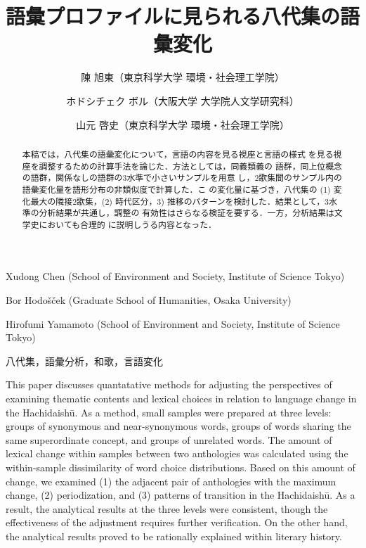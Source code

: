 \documentclass[submit]{ipsj}
\date{}
\title{}
\begin{document}
\title{語彙プロファイルに見られる八代集の語彙変化}


\author{陳 旭東（東京科学大学 環境・社会理工学院）}{Xudong Chen (School of Environment and Society, Institute of Science Tokyo)}{}
\author{ホドシチェク ボル（大阪大学 大学院人文学研究科）}{Bor Hodo\v{s}\v{c}ek (Graduate School of Humanities, Osaka University)}{}
\author{山元 啓史（東京科学大学 環境・社会理工学院）}{Hirofumi Yamamoto (School of Environment and Society, Institute of Science Tokyo)}{}

\begin{abstract}
  本稿では，八代集の語彙変化について，言語の内容を見る視座と言語の様式
  を見る視座を調整するための計算手法を論じた．方法としては，同義類義の
  語群，同上位概念の語群，関係なしの語群の3水準で小さいサンプルを用意
  し，2歌集間のサンプル内の語彙変化量を語形分布の非類似度で計算した．こ
  の変化量に基づき，八代集の (1) 変化最大の隣接2歌集，(2) 時代区分，3)
  推移のパターンを検討した．結果として，3水準の分析結果が共通し，調整の
  有効性はさらなる検証を要する．一方，分析結果は文学史においても合理的
  に説明しうる内容となった．
\end{abstract}

\begin{jkeyword}
  八代集，語彙分析，和歌，言語変化
\end{jkeyword}

\begin{eabstract}
  This paper discusses quantatative methods for adjusting the
  perspectives of examining thematic contents and lexical choices in
  relation to language change in the Hachidaishū. As a method, small
  samples were prepared at three levels: groups of synonymous and
  near-synonymous words, groups of words sharing the same
  superordinate concept, and groups of unrelated words. The amount of
  lexical change within samples between two anthologies was calculated
  using the within-sample dissimilarity of word choice
  distributions. Based on this amount of change, we examined (1) the
  adjacent pair of anthologies with the maximum change, (2)
  periodization, and (3) patterns of transition in the Hachidaishū. As
  a result, the analytical results at the three levels were
  consistent, though the effectiveness of the adjustment requires
  further verification. On the other hand, the analytical results
  proved to be rationally explained within literary history.
\end{eabstract}
\end{document}
